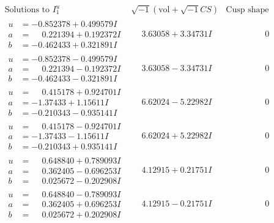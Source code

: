 \documentclass[1p]{elsarticle_modified}
\theoremstyle{definition}
\newcommand{\I}{\sqrt{-1}}
\begin{document}
$$\begin{array}{c|c|c}  
\text{Solutions to }I^u_{1}& \I (\text{vol} + \sqrt{-1}CS) & \text{Cusp shape}\\
 \hline 
\begin{aligned}
u &= -0.852378 + 0.499579 I \\
a &= \phantom{-}0.221394 + 0.192372 I \\
b &= -0.462433 + 0.321891 I\end{aligned}
 & \phantom{-}3.63058 + 3.34731 I & \phantom{-0.000000 } 0 \\ \hline\begin{aligned}
u &= -0.852378 - 0.499579 I \\
a &= \phantom{-}0.221394 - 0.192372 I \\
b &= -0.462433 - 0.321891 I\end{aligned}
 & \phantom{-}3.63058 - 3.34731 I & \phantom{-0.000000 } 0 \\ \hline\begin{aligned}
u &= \phantom{-}0.415178 + 0.924701 I \\
a &= -1.37433 + 1.15611 I \\
b &= -0.210343 - 0.935141 I\end{aligned}
 & \phantom{-}6.62024 - 5.22982 I & \phantom{-0.000000 } 0 \\ \hline\begin{aligned}
u &= \phantom{-}0.415178 - 0.924701 I \\
a &= -1.37433 - 1.15611 I \\
b &= -0.210343 + 0.935141 I\end{aligned}
 & \phantom{-}6.62024 + 5.22982 I & \phantom{-0.000000 } 0 \\ \hline\begin{aligned}
u &= \phantom{-}0.648840 + 0.789093 I \\
a &= \phantom{-}0.362405 - 0.696253 I \\
b &= \phantom{-}0.025672 - 0.202908 I\end{aligned}
 & \phantom{-}4.12915 + 0.21751 I & \phantom{-0.000000 } 0 \\ \hline\begin{aligned}
u &= \phantom{-}0.648840 - 0.789093 I \\
a &= \phantom{-}0.362405 + 0.696253 I \\
b &= \phantom{-}0.025672 + 0.202908 I\end{aligned}
 & \phantom{-}4.12915 - 0.21751 I & \phantom{-0.000000 } 0 \\ \hline\begin{aligned}

\end{aligned}
\end{array}$$
\end{document}
